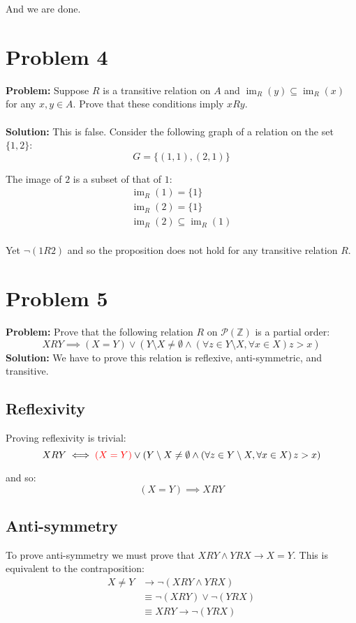 \documentclass{article}
\begin{document}
And we are done.

\section*{Problem 4}
\textbf{Problem:} Suppose $R$ is a transitive relation on $A$ and $\operatorname{im}_R(y)\subseteq\operatorname{im}_R(x)$ for any $x,y\in A$. Prove that these conditions imply $xRy$.
\\\\
\textbf{Solution:} This is false. Consider the following graph of a relation on the set $\{1,2\}$:
$$G=\{(1,1),(2,1)\}$$

The image of $2$ is a subset of that of $1$:
\begin{gather*}
  \operatorname{im}_R(1)=\{1\}\\
  \operatorname{im}_R(2)=\{1\}\\
  \operatorname{im}_R(2)\subseteq\operatorname{im}_R(1)\\
\end{gather*}

Yet $\neg(1R2)$ and so the proposition does not hold for any transitive relation $R$.

\section*{Problem 5}
\textbf{Problem:} Prove that the following relation $R$ on $\mathcal P(\mathbb Z)$ is a partial order:
$$XRY\implies (X=Y)\vee (Y\setminus X\not=\emptyset\wedge \left(\forall z\in Y\setminus X,\forall x\in X\right) z>x)$$
\textbf{Solution:} We have to prove this relation is reflexive, anti-symmetric, and transitive.

\subsection*{Reflexivity}
Proving reflexivity is trivial:
$$XRY\iff\textcolor{red}{(X=Y)}\vee (Y\setminus X\not=\emptyset\wedge \left(\forall z\in Y\setminus X,\forall x\in X\right) z>x)$$

and so:
$$(X=Y)\implies XRY$$

\subsection*{Anti-symmetry}
To prove anti-symmetry we must prove that $XRY\wedge YRX\rightarrow X=Y$. This is equivalent to the contraposition:
\begin{align*}
X\not=Y&\rightarrow\neg(XRY\wedge YRX)\\
&\equiv\neg(XRY)\vee\neg(YRX)\\
&\equiv XRY\rightarrow\neg(YRX)
\end{align*}
\end{document}

